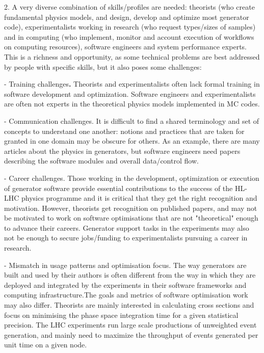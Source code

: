 \documentclass[10pt,a4paper]{article}
\begin{document}
2. {A very diverse combination of skills/profiles are needed}: theorists
(who create fundamental physics models, and design, develop and optimize
most generator code), experimentalists working in research (who request
types/sizes of samples) and in computing (who implement, monitor and
account execution of workflows on computing resources), software
engineers and system performance experts. This is a richness and
opportunity, as some technical problems are best addressed by people
with specific skills, but it also poses some challenges:

- {Training challenges}\textbf{.} Theorists and experimentalists often
lack formal training in software development and optimization. Software
engineers and experimentalists are often not experts in the theoretical
physics models implemented in MC codes.

- {Communication challenges}. It is difficult to find a shared
terminology and set of concepts to understand one another: notions and
practices that are taken for granted in one domain may be obscure for
others. As an example, there are many articles about the physics in
generators, but software engineers need papers describing the software
modules and overall data/control flow.

- {Career challenges}. Those working in the development, optimization or
execution of generator software provide essential contributions to the
success of the HL-LHC physics programme and it is critical that they get
the right recognition and motivation. However, theorists get recognition
on published papers, and may not be motivated to work on software
optimisations that are not "theoretical" enough to advance their
careers. Generator support tasks in the experiments may also not be
enough to secure jobs/funding to experimentalists pursuing a career in
research.

- {Mismatch in usage patterns and optimisation focus}. The way
generators are built and used by their authors is often different from
the way in which they are deployed and integrated by the experiments in
their software frameworks and computing infrastructure.The goals and
metrics of software optimisation work may also differ. Theorists are
mainly interested in calculating cross sections and focus on minimising
the phase space integration time for a given statistical precision. The
LHC experiments run large scale productions of unweighted event
generation, and mainly need to maximize the throughput of events
generated per unit time on a given node.
\end{document}
